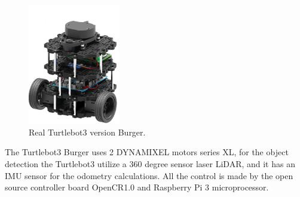 \begin{figure}[htbp]
\centerline{\includegraphics[width=4cm]{images/burger_real.png}}
\caption{Real Turtlebot3 version Burger.}
\label{fig:turtlebot3}
\end{figure}

The Turtlebot3 Burger uses 2 DYNAMIXEL motors series XL, for the object detection the Turtlebot3 utilize a 360 degree sensor laser LiDAR, and it has an IMU sensor for the odometry calculations.
All the control is made by the open source controller board OpenCR1.0 and Raspberry Pi 3 microprocessor.


